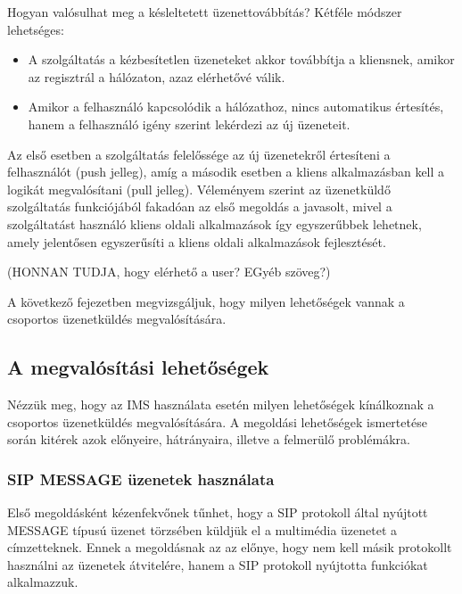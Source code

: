 Hogyan valósulhat meg a késleltetett üzenettovábbítás? Kétféle módszer lehetséges:

\begin{itemize}\itemsep1pt
\item	A szolgáltatás a kézbesítetlen üzeneteket akkor továbbítja a kliensnek, amikor az regisztrál a hálózaton, azaz elérhetővé válik.
\item Amikor a felhasználó kapcsolódik a hálózathoz, nincs automatikus értesítés, hanem a felhasználó igény szerint lekérdezi az új üzeneteit.
\end{itemize} 

Az első esetben a szolgáltatás felelőssége az új üzenetekről értesíteni a felhasználót (push jelleg), amíg a második esetben a kliens alkalmazásban kell a logikát megvalósítani (pull jelleg). Véleményem szerint az üzenetküldő szolgáltatás funkciójából fakadóan az első megoldás a javasolt, mivel a szolgáltatást használó kliens oldali alkalmazások így egyszerűbbek lehetnek, amely jelentősen egyszerűsíti a kliens oldali alkalmazások fejlesztését.

{\color{red}(HONNAN TUDJA, hogy elérhető a user? EGyéb szöveg?)}

A következő fejezetben megvizsgáljuk, hogy milyen lehetőségek vannak a csoportos üzenetküldés megvalósítására.

\subsection{A megvalósítási lehetőségek}

Nézzük meg, hogy az IMS használata esetén milyen lehetőségek kínálkoznak a csoportos üzenetküldés megvalósítására. A megoldási lehetőségek ismertetése során kitérek azok előnyeire, hátrányaira, illetve a felmerülő problémákra.

\subsubsection{SIP MESSAGE üzenetek használata}
\label{sec:sip_message}

Első megoldásként kézenfekvőnek tűnhet, hogy a SIP protokoll által nyújtott MESSAGE típusú üzenet törzsében küldjük el a multimédia üzenetet a címzetteknek. Ennek a megoldásnak az az előnye, hogy nem kell másik protokollt használni az üzenetek átvitelére, hanem a SIP protokoll nyújtotta funkciókat alkalmazzuk. 

